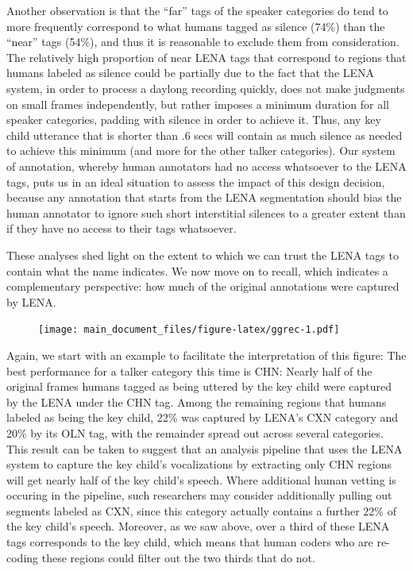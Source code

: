 \documentclass[english,floatsintext,man]{apa6}
\begin{document}
Another observation is that the \enquote{far} tags of the speaker
categories do tend to more frequently correspond to what humans tagged
as silence (74\%) than the \enquote{near} tags (54\%), and thus it is
reasonable to exclude them from consideration. The relatively high
proportion of near LENA tags that correspond to regions that humans
labeled as silence could be partially due to the fact that the LENA
system, in order to process a daylong recording quickly, does not make
judgments on small frames independently, but rather imposes a minimum
duration for all speaker categories, padding with silence in order to
achieve it. Thus, any key child utterance that is shorter than .6 secs
will contain as much silence as needed to achieve this minimum (and more
for the other talker categories). Our system of annotation, whereby
human annotators had no access whatsoever to the LENA tags, puts us in
an ideal situation to assess the impact of this design decision, because
any annotation that starts from the LENA segmentation should bias the
human annotator to ignore such short interstitial silences to a greater
extent than if they have no access to their tags whatsoever.

These analyses shed light on the extent to which we can trust the LENA
tags to contain what the name indicates. We now move on to recall, which
indicates a complementary perspective: how much of the original
annotations were captured by LENA.

\begin{figure}
\centering
\texttt{[image: main\_document\_files/figure-latex/ggrec-1.pdf]}
\caption{}
\end{figure}

Again, we start with an example to facilitate the interpretation of this
figure: The best performance for a talker category this time is CHN:
Nearly half of the original frames humans tagged as being uttered by the
key child were captured by the LENA under the CHN tag. Among the
remaining regions that humans labeled as being the key child, 22\% was
captured by LENA's CXN category and 20\% by its OLN tag, with the
remainder spread out across several categories. This result can be taken
to suggest that an analysis pipeline that uses the LENA system to
capture the key child's vocalizations by extracting only CHN regions
will get nearly half of the key child's speech. Where additional human
vetting is occuring in the pipeline, such researchers may consider
additionally pulling out segments labeled as CXN, since this category
actually contains a further 22\% of the key child's speech. Moreover, as
we saw above, over a third of these LENA tags corresponds to the key
child, which means that human coders who are re-coding these regions
could filter out the two thirds that do not.
\end{document}
